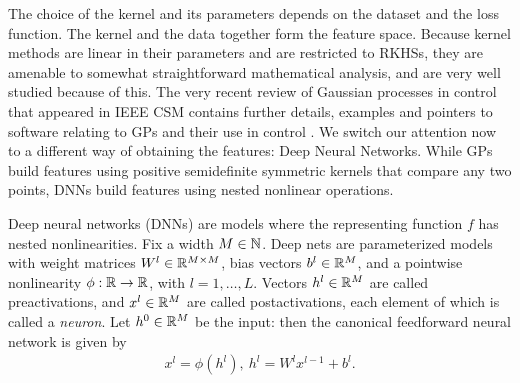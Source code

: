 The choice of the kernel and its parameters
depends on the dataset and the loss function. The kernel and the data together form the feature space. Because kernel methods are linear
in their parameters and are restricted to RKHSs, they are amenable to somewhat straightforward mathematical analysis, and are very well
studied because of this. The very recent review of Gaussian processes in control that appeared in IEEE CSM contains further details, examples and pointers to software relating to GPs and their use in control \cite{Liu2018csmtutorial}. We switch our attention now to a different way of obtaining the features: Deep Neural Networks. While GPs build features using positive semidefinite symmetric kernels that compare any two points, DNNs build features using nested nonlinear operations. %

Deep neural networks (DNNs) are models where the representing function $f$ has nested nonlinearities. Fix a width $M\in\mathbb{N}$. Deep nets are
parameterized models with 
weight matrices $W^l\in\mathbb{R}^{M\times M}$, bias vectors $b^l\in\mathbb{R}^{M}$, and a pointwise nonlinearity $\phi:\mathbb{R}\to\mathbb{R}$, 
with $l=1,\dots,L$. Vectors $h^l\in\mathbb{R}^{M}$ are called preactivations, and $x^l\in\mathbb{R}^{M}$ are called postactivations,
each element of which is called a \emph{neuron}. 
Let $h^0\in\mathbb{R}^{M}$ be the input: then the canonical feedforward neural network is given by 
\begin{align*}
 x^l = \phi(h^l), \ h^l = W^lx^{l-1} + b^l.
\end{align*}

